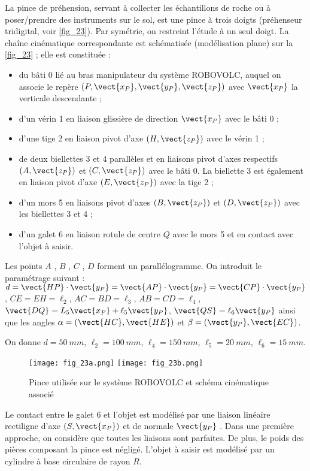 La pince de préhension, servant à collecter les échantillons de roche ou à poser/prendre des
instruments sur le sol, est une pince à trois doigts (préhenseur tridigital, voir \autoref{fig_23}). Par
symétrie, on restreint l'étude à un seul doigt.
La chaîne cinématique correspondante est schématisée (modélisation plane) sur la \autoref{fig_23} ; elle
est constituée :
\begin{itemize}
\item du bâti 0 lié au bras manipulateur du système ROBOVOLC, auquel on associe le repère $\left(P,\vect{x_P},\vect{y_P},\vect{z_P}\right)$ avec
$\vect{x_P}$ la verticale descendante ;
\item  d'un vérin 1 en liaison glissière de direction $\vect{x_P}$ avec le bâti 0 ;
\item  d'une tige 2 en liaison pivot d'axe $\left(H,\vect{z_P}\right)$ avec le vérin 1 ;
\item  de deux biellettes 3 et 4 parallèles et en liaisons pivot d'axes respectifs $\left(A,\vect{z_P}\right)$ et $\left(C,\vect{z_P}\right)$
avec le bâti 0. La biellette 3 est également en liaison pivot d'axe $\left(E,\vect{z_P}\right)$ avec la tige 2 ;
\item  d'un mors 5 en liaisons pivot d'axes $\left(B,\vect{z_P}\right)$ et $\left(D,\vect{z_P}\right)$ avec les biellettes 3 et 4 ;
\item  d'un galet 6 en liaison rotule de centre $Q$ avec le mors 5 et en contact avec l'objet à saisir.
\end{itemize}
Les points $A$ , $B$ , $C$ , $D$ forment un parallélogramme. On introduit le paramétrage suivant :
$d=\vect{HP} \cdot \vect{y_P}=\vect{AP} \cdot \vect{y_P}=\vect{CP} \cdot \vect{y_P}$, 
$CE = EH = \ell_2$, 
$AC = BD = \ell_3$,
$AB = CD = \ell_4$,
$\vect{DQ} = L_5\vect{x_P} + \ell_5 \vect{y_P}$, 
$\vect{QS} = \ell_6\vect{y_P}$
ainsi que les angles
$\alpha = \left(\vect{HC},\vect{HE}\right)$
et  $\beta = \left(\vect{y_P},\vect{EC}\right)$.

On donne $d = \SI{50}{mm}$, $\ell_2 =\SI{100}{mm}$, $\ell_4 =\SI{150}{mm}$, $\ell_5 =\SI{20}{mm}$, $\ell_6 =\SI{15}{mm}$.

\begin{figure}[H]
\centering
\texttt{[image: fig\_23a.png]}
\texttt{[image: fig\_23b.png]}
\caption{Pince utilisée sur le système ROBOVOLC et schéma cinématique associé \label{fig_23}}
\end{figure}


Le contact entre le galet 6 et l'objet est modélisé par une liaison linéaire rectiligne d'axe $\left(S,\vect{x_P}\right)$ et
de normale $\vect{y_P}$ .
Dans une première approche, on considère que toutes les liaisons sont parfaites. De plus, le poids
des pièces composant la pince est négligé.
L'objet à saisir est modélisé par un cylindre à base circulaire de rayon $R$.


